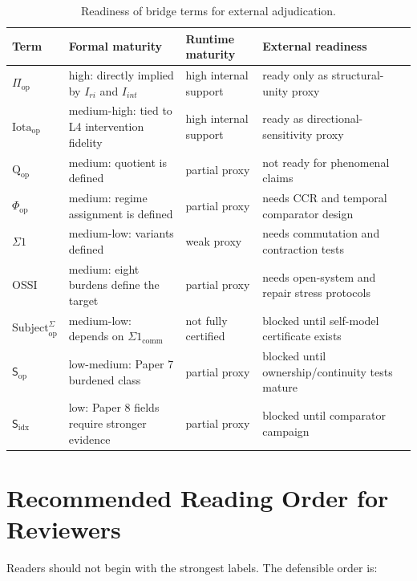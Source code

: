 \documentclass[11pt,a4paper]{article}
\theoremstyle{definition}
\newcommand{\Subop}{\mathsf{S}_{\mathrm{op}}}
\newcommand{\Subfp}{\mathsf{S}_{\mathrm{idx}}}
\newcommand{\Subbridge}{\mathrm{Subject}^{\Sigma}_{\mathrm{op}}}
\newcommand{\Qop}{\mathrm{Q}_{\mathrm{op}}}
\newcommand{\Piop}{\Pi_{\mathrm{op}}}
\newcommand{\Iotaop}{\mathrm{Iota}_{\mathrm{op}}}
\newcommand{\Phiop}{\Phi_{\mathrm{op}}}
\begin{document}
\begin{table}[ht]
\centering
\caption{Readiness of bridge terms for external adjudication.}
\label{tab:external-readiness}
\small
\begin{tabularx}{\textwidth}{>{\raggedright\arraybackslash}p{2.7cm} Y Y Y}
\toprule
Term & Formal maturity & Runtime maturity & External readiness \\
\midrule
$\Piop$ & high: directly implied by $I_{ri}$ and $I_{int}$ & high internal support & ready only as structural-unity proxy \\
$\Iotaop$ & medium-high: tied to L4 intervention fidelity & high internal support & ready as directional-sensitivity proxy \\
$\Qop$ & medium: quotient is defined & partial proxy & not ready for phenomenal claims \\
$\Phiop$ & medium: regime assignment is defined & partial proxy & needs CCR and temporal comparator design \\
$\Sigma1$ & medium-low: variants defined & weak proxy & needs commutation and contraction tests \\
OSSI & medium: eight burdens define the target & partial proxy & needs open-system and repair stress protocols \\
$\Subbridge$ & medium-low: depends on $\Sigma1_{\mathrm{comm}}$ & not fully certified & blocked until self-model certificate exists \\
$\Subop$ & low-medium: Paper 7 burdened class & partial proxy & blocked until ownership/continuity tests mature \\
$\Subfp$ & low: Paper 8 fields require stronger evidence & partial proxy & blocked until comparator campaign \\
\bottomrule
\end{tabularx}
\end{table}

\section{Recommended Reading Order for Reviewers}

Readers should not begin with the strongest labels. The defensible order is:
\end{document}
